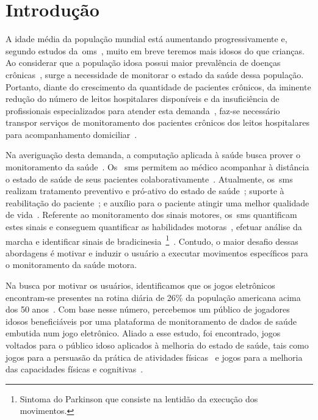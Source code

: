 \chapter{Introdu\c{c}\~{a}o} \label{chapter:intro}

A idade média da população mundial está aumentando progressivamente e, segundo estudos da~\ac{oms}~\cite{ageing2011}, muito em breve teremos mais idosos do que crianças. Ao considerar que a população idosa possui maior prevalência de doenças crônicas~\cite{prevcronica2009}, surge a necessidade de monitorar o estado da saúde dessa população. Portanto, diante do crescimento da quantidade de pacientes crônicos, da iminente redução do número de leitos hospitalares disponíveis e da insuficiência de profissionais especializados para atender esta demanda~\cite{healthmonitoring2013}, faz-se necessário transpor serviços de monitoramento dos pacientes crônicos dos leitos hospitalares para acompanhamento domiciliar~\cite{homecarebrazil2011}. 

Na averiguação desta demanda, a computação aplicada à saúde busca prover o monitoramento da saúde~\cite{healthmonitoring2013,bardram2010,aarhus_negotiating_2010}. Os ~\ac{sms} permitem ao médico acompanhar à distância o estado de saúde de seus pacientes colaborativamente~\cite{healthmonitoring2013}. Atualmente, os~\ac{sms} realizam tratamento preventivo e pró-ativo do estado de saúde~\cite{bardram2010}; suporte à reabilitação do paciente~\cite{sacbespoke2014}; e auxílio para o paciente atingir uma melhor qualidade de vida~\cite{sacsvmhms2014}. Referente ao monitoramento dos sinais motores, os~\ac{sms} quantificam estes sinais e conseguem quantificar as habilidades motoras~\cite{manumeterjbhi2014,patel_monitoring_2009}, efetuar análise da marcha \cite{robotgait2014} e identificar sinais de bradicinesia~\footnote{Sintoma do Parkinson que consiste na lentidão da execução dos movimentos.}~\cite{ambulatoryparkinson2010}. Contudo, o maior desafio dessas abordagens é motivar e induzir o usuário a executar movimentos específicos para o monitoramento da saúde motora.

Na busca por motivar os usuários, identificamos que os jogos eletrônicos encontram-se presentes na rotina diária de 26\% da população americana acima dos 50 anos~\cite{esa2016}. Com base nesse número, percebemos um público de jogadores idosos beneficiáveis por uma plataforma de monitoramento de dados de saúde embutida num jogo eletrônico. Aliado a esse estudo, foi encontrado, jogos voltados para o público idoso aplicados à melhoria do estado de saúde, tais como jogos para a persuasão da prática de atividades físicas~\cite{brox11} e jogos para a melhoria das capacidades físicas e cognitivas~\cite{arntzen2011}. 

